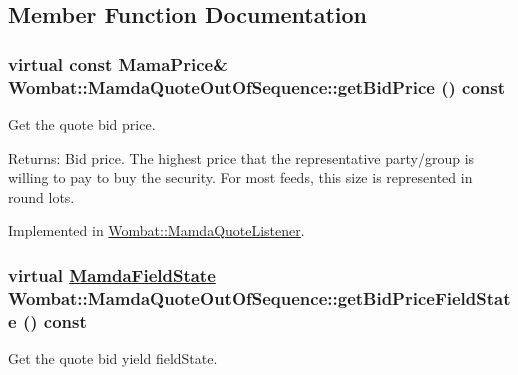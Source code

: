 \subsection{Member Function Documentation}
\hypertarget{classWombat_1_1MamdaQuoteOutOfSequence_af6014e4342076750ed12bcb4cefe62d}{
\subsubsection[getBidPrice]{\setlength{\rightskip}{0pt plus 5cm}virtual const Mama\-Price\& Wombat::Mamda\-Quote\-Out\-Of\-Sequence::get\-Bid\-Price () const}}
\label{classWombat_1_1MamdaQuoteOutOfSequence_af6014e4342076750ed12bcb4cefe62d}


Get the quote bid price. 

\begin{Desc}
\item[Returns:]Bid price. The highest price that the representative party/group is willing to pay to buy the security. For most feeds, this size is represented in round lots. \end{Desc}


Implemented in \hyperlink{classWombat_1_1MamdaQuoteListener_af4b7f010c56303476dc4de64fa0b3f4}{Wombat::Mamda\-Quote\-Listener}.\hypertarget{classWombat_1_1MamdaQuoteOutOfSequence_0c70e9a4b5c452a8f22d79f3faf67cf7}{
\subsubsection[getBidPriceFieldState]{\setlength{\rightskip}{0pt plus 5cm}virtual \hyperlink{namespaceWombat_93aac974f2ab713554fd12a1fa3b7d2a}{Mamda\-Field\-State} Wombat::Mamda\-Quote\-Out\-Of\-Sequence::get\-Bid\-Price\-Field\-State () const}}
\label{classWombat_1_1MamdaQuoteOutOfSequence_0c70e9a4b5c452a8f22d79f3faf67cf7}


Get the quote bid yield field\-State. 

